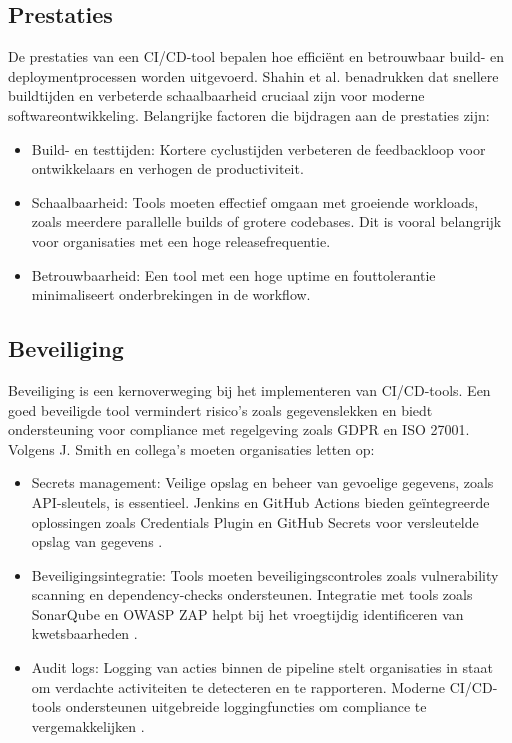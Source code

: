 \subsection{Prestaties}
De prestaties van een CI/CD-tool bepalen hoe efficiënt en betrouwbaar build- en deploymentprocessen worden uitgevoerd. Shahin et al. \autocite{shahin2017} benadrukken dat snellere buildtijden en verbeterde schaalbaarheid cruciaal zijn voor moderne softwareontwikkeling.
Belangrijke factoren die bijdragen aan de prestaties zijn: \begin{itemize} \item Build- en testtijden: Kortere cyclustijden verbeteren de feedbackloop voor ontwikkelaars en verhogen de productiviteit. \item Schaalbaarheid: Tools moeten effectief omgaan met groeiende workloads, zoals meerdere parallelle builds of grotere codebases. Dit is vooral belangrijk voor organisaties met een hoge releasefrequentie. \autocite{springer2023ci} \item Betrouwbaarheid: Een tool met een hoge uptime en fouttolerantie minimaliseert onderbrekingen in de workflow. \autocite{ieee2021cicd} \end{itemize}

\subsection{Beveiliging}
Beveiliging is een kernoverweging bij het implementeren van CI/CD-tools. Een goed beveiligde tool vermindert risico's zoals gegevenslekken en biedt ondersteuning voor compliance met regelgeving zoals GDPR en ISO 27001. Volgens J. Smith en collega's \autocite{smith2023securityci} moeten organisaties letten op:
\begin{itemize} 
    \item Secrets management: Veilige opslag en beheer van gevoelige gegevens, zoals API-sleutels, is essentieel. Jenkins en GitHub Actions bieden geïntegreerde oplossingen zoals Credentials Plugin en GitHub Secrets voor versleutelde opslag van gegevens \autocite{githubdocs2023secrets}.
    \item Beveiligingsintegratie: Tools moeten beveiligingscontroles zoals vulnerability scanning en dependency-checks ondersteunen. Integratie met tools zoals SonarQube en OWASP ZAP helpt bij het vroegtijdig identificeren van kwetsbaarheden \autocite{owasp2023}.
    \item Audit logs: Logging van acties binnen de pipeline stelt organisaties in staat om verdachte activiteiten te detecteren en te rapporteren. Moderne CI/CD-tools ondersteunen uitgebreide loggingfuncties om compliance te vergemakkelijken \autocite{forsgren2018}.
\end{itemize}

